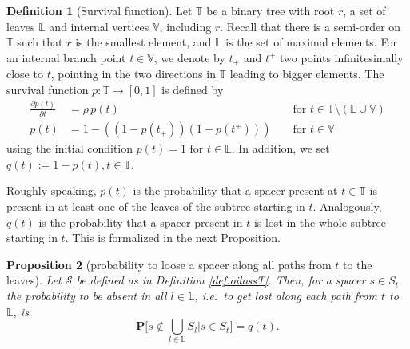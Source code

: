 \documentclass[preprint,authoryear]{elsarticle}
\newtheorem{proposition}{Proposition}[section]
\theoremstyle{definition}
\newtheorem{definition}[proposition]{Definition}
\numberwithin{equation}{section}
\numberwithin{figure}{section}
\begin{document}
\begin{definition}[Survival function]
  \label{def:survival}
  Let $\mathbb T$ be a binary tree with root $r$, a set of leaves
  $\mathbb L$ and internal vertices $\mathbb V$, including $r$. Recall that there is
  a semi-order on $\mathbb T$ such that $r$ is the smallest element,
  and $\mathbb L$ is the set of maximal elements. For an internal
  branch point $t \in \mathbb V$, we denote by $t_+$ and $t^+$ two
  points infinitesimally close to $t$, pointing in the two directions
  in $\mathbb T$ leading to bigger elements.  The survival function
  $p: \mathbb T \rightarrow [0,1]$ is defined by 
  \begin{align*}
    \frac{ \partial p(t) } {\partial t}  &= \rho\,p(t) &&\text{ for } t \in \mathbb T \setminus (\mathbb L \cup \mathbb V) \\
    p(t) &= 1 - ( (1-p(t_+))  (1-p(t^+))  )  &&\text{ for } t \in \mathbb V\phantom{\setminus (\mathbb L \cup \mathbb V)}
  \end{align*}
  using the initial condition $p(t) = 1 \text{ for } t \in \mathbb L.$
  In addition, we set $q(t) := 1-p(t), t\in\mathbb T$.
\end{definition}

Roughly speaking, $p(t)$ is the probability that a spacer present at
$t \in \mathbb T$ is present in at least one of the leaves of the subtree
starting in $t$. Analogously, $q(t)$ is the
probability that a spacer present in $t$ is lost in the whole subtree
starting in $t$.  This is formalized in the next Proposition.

\begin{proposition}[probability to loose a spacer along all paths from
  $t$ to the leaves]
 \label{prop:looseall}
 Let $\mathcal S$ be defined as in Definition \ref{def:oilossT}.  Then, for a
 spacer $s \in S_t$ the probability to be absent in all
 $l\in\mathbb L$, i.e.\ to get lost along each path from $t$ to
 $\mathbb L$, is
 \begin{equation}
   \mathbf P\Big[ s \notin \bigcup\limits_{l \in \mathbb L} S_l | s \in S_t  \Big] = q(t).
 \end{equation}
\end{proposition}
\end{document}
